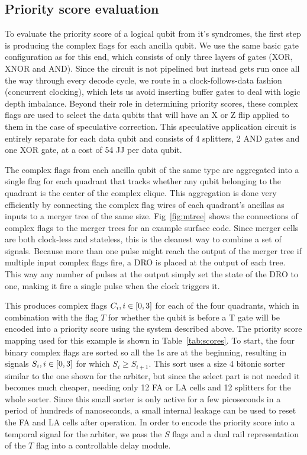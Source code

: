 \documentclass[conference]{IEEEtran}
\begin{document}
\subsection{Priority score evaluation}

To evaluate the priority score of a logical qubit from it's syndromes, the first step is producing the complex flags for each ancilla qubit.
We use the same basic gate configuration as \cite{btwc} for this end, which consists of only three layers of gates (XOR, XNOR and AND). 
Since the circuit is not pipelined but instead gets run once all the way through every decode cycle, we route in a clock-follows-data fashion (concurrent clocking), which lets us avoid inserting buffer gates to deal with logic depth imbalance.
Beyond their role in determining priority scores, these complex flags are used to select the data qubits that will have an X or Z flip applied to them in the case of speculative correction.
This speculative application circuit is entirely separate for each data qubit and consists of 4 splitters, 2 AND gates and one XOR gate, at a cost of 54 JJ per data qubit.

The complex flags from each ancilla qubit of the same type are aggregated into a single flag for each quadrant that tracks whether any qubit belonging to the quadrant is the center of the complex clique.
This aggregation is done very efficiently by connecting the complex flag wires of each quadrant's ancillas as inputs to a merger tree of the same size.
Fig~\ref{fig:mtree} shows the connections of complex flags to the merger trees for an example surface code.
Since merger cells are both clock-less and stateless, this is the cleanest way to combine a set of signals.
Because more than one pulse might reach the output of the merger tree if multiple input complex flags fire, a DRO is placed at the output of each tree.
This way any number of pulses at the output simply set the state of the DRO to one, making it fire a single pulse when the clock triggers it.

This produces complex flags $C_i, i \in \interval{0}{3}$ for each of the four quadrants, which in combination with the flag $T$ for whether the qubit is before a T gate will be encoded into a priority score using the system described above.
The priority score mapping used for this example is shown in Table~\ref{tab:scores}.
To start, the four binary complex flags are sorted so all the 1s are at the beginning, resulting in signals $S_i, i \in \interval{0}{3}$ for which $S_{i} \ge S_{i+1}$.
This sort uses a size 4 bitonic sorter similar to the one shown for the arbiter, but since the select part is not needed it becomes much cheaper, needing only 12 FA or LA cells and 12 splitters for the whole sorter.
Since this small sorter is only active for a few picoseconds in a period of hundreds of nanoseconds, a small internal leakage can be used to reset the FA and LA cells after operation.
In order to encode the priority score into a temporal signal for the arbiter, we pass the $S$ flags and a dual rail representation of the $T$ flag into a controllable delay module.
\end{document}
